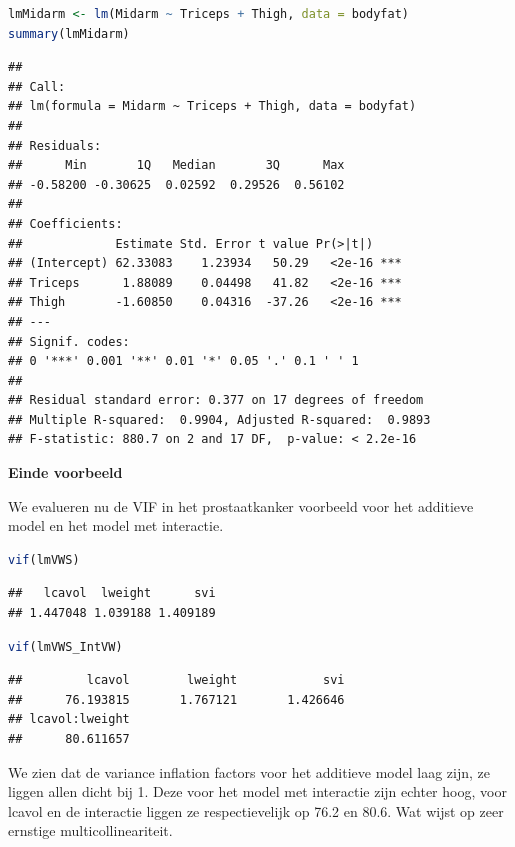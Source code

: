 \documentclass[
  12pt,dutch,coursenotes]{book}
\begin{document}
\begin{lstlisting}[language=R]
lmMidarm <- lm(Midarm ~ Triceps + Thigh, data = bodyfat)
summary(lmMidarm)
\end{lstlisting}

\begin{lstlisting}
## 
## Call:
## lm(formula = Midarm ~ Triceps + Thigh, data = bodyfat)
## 
## Residuals:
##      Min       1Q   Median       3Q      Max 
## -0.58200 -0.30625  0.02592  0.29526  0.56102 
## 
## Coefficients:
##             Estimate Std. Error t value Pr(>|t|)    
## (Intercept) 62.33083    1.23934   50.29   <2e-16 ***
## Triceps      1.88089    0.04498   41.82   <2e-16 ***
## Thigh       -1.60850    0.04316  -37.26   <2e-16 ***
## ---
## Signif. codes:  
## 0 '***' 0.001 '**' 0.01 '*' 0.05 '.' 0.1 ' ' 1
## 
## Residual standard error: 0.377 on 17 degrees of freedom
## Multiple R-squared:  0.9904, Adjusted R-squared:  0.9893 
## F-statistic: 880.7 on 2 and 17 DF,  p-value: < 2.2e-16
\end{lstlisting}

\textbf{Einde voorbeeld}

We evalueren nu de VIF in het prostaatkanker voorbeeld voor het additieve model en het model met interactie.

\begin{lstlisting}[language=R]
vif(lmVWS)
\end{lstlisting}

\begin{lstlisting}
##   lcavol  lweight      svi 
## 1.447048 1.039188 1.409189
\end{lstlisting}

\begin{lstlisting}[language=R]
vif(lmVWS_IntVW)
\end{lstlisting}

\begin{lstlisting}
##         lcavol        lweight            svi 
##      76.193815       1.767121       1.426646 
## lcavol:lweight 
##      80.611657
\end{lstlisting}

We zien dat de variance inflation factors voor het additieve model laag zijn, ze liggen allen dicht bij 1.
Deze voor het model met interactie zijn echter hoog, voor lcavol en de interactie liggen ze respectievelijk op 76.2 en 80.6.
Wat wijst op zeer ernstige multicollineariteit.
\end{document}
